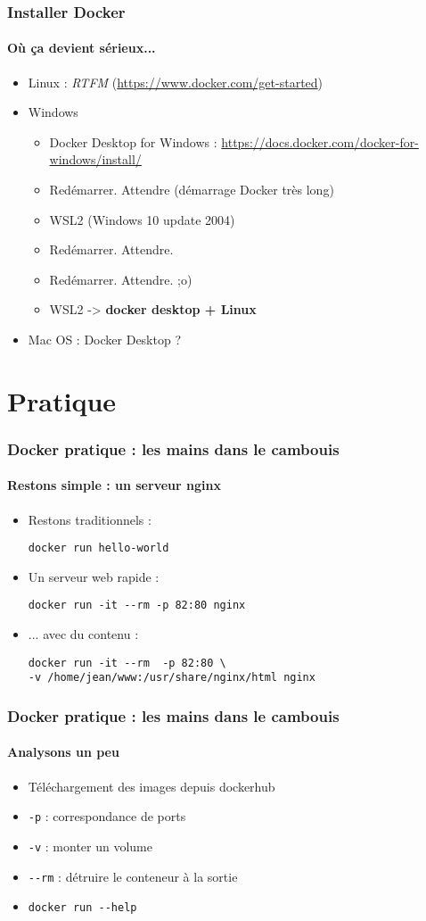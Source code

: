 \documentclass[11pt]{beamer}
\begin{document}
\begin{frame}
\frametitle{Installer Docker}
\framesubtitle{Où ça devient sérieux...}
\begin{itemize}
	\item Linux : \textit{RTFM} (\url{https://www.docker.com/get-started})
	\item Windows
	\begin{itemize}
		\item Docker Desktop for Windows : 
		\url{https://docs.docker.com/docker-for-windows/install/}
		\item Redémarrer. Attendre (démarrage Docker très long)
		\item WSL2 (Windows 10 update 2004)
		\item Redémarrer. Attendre.
		\item Redémarrer. Attendre.   ;o)
		\item WSL2  -> \textbf{docker desktop + Linux}
	\end{itemize}
	\item Mac OS : Docker Desktop ?
\end{itemize}
\end{frame}

\section{Pratique}

\begin{frame}[fragile]
\frametitle{Docker pratique : les mains dans le cambouis }
\framesubtitle{Restons simple : un serveur nginx}
\begin{itemize}
	\item Restons traditionnels : 
	\begin{lstlisting}
docker run hello-world	
	\end{lstlisting}
	\item Un serveur web rapide : 
	\begin{lstlisting}
docker run -it --rm -p 82:80 nginx
	\end{lstlisting}
	\item ... avec du contenu : 
	\begin{lstlisting}
docker run -it --rm  -p 82:80 \
-v /home/jean/www:/usr/share/nginx/html nginx
	\end{lstlisting}
\end{itemize}
\end{frame}

\begin{frame}[fragile]
\frametitle{Docker pratique : les mains dans le cambouis }
\framesubtitle{Analysons un peu}
\begin{itemize}
	\item Téléchargement des images depuis dockerhub
	\item \verb|-p| : correspondance de ports
	\item \verb|-v| : monter un volume
	\item \verb|--rm| : détruire le conteneur à la sortie
	\item \verb|docker run --help|
\end{itemize}
\end{frame}
\end{document}
